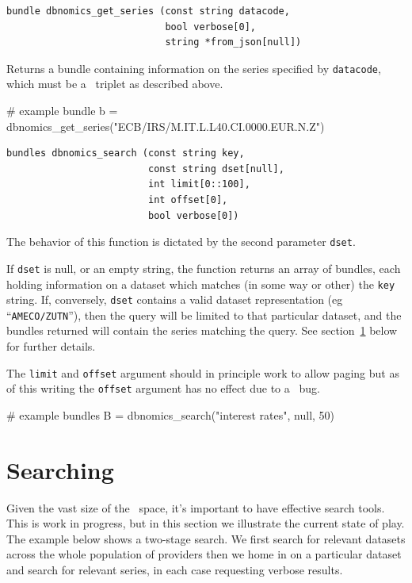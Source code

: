 \documentclass{article}
\begin{document}
\begin{funcdoc}
\begin{verbatim}
bundle dbnomics_get_series (const string datacode,
                            bool verbose[0],
                            string *from_json[null])
\end{verbatim}
Returns a bundle containing information on the series specified by
\texttt{datacode}, which must be a \DB\ triplet as
described above.
\begin{code}
# example
bundle b = dbnomics_get_series("ECB/IRS/M.IT.L.L40.CI.0000.EUR.N.Z")
\end{code}
\end{funcdoc}

\begin{funcdoc}
\begin{verbatim}
bundles dbnomics_search (const string key,
                         const string dset[null],
                         int limit[0::100],
                         int offset[0],
                         bool verbose[0])
\end{verbatim}
  The behavior of this function is dictated by the second parameter
  \texttt{dset}.

  If \texttt{dset} is null, or an empty string, the function
  returns an array of bundles, each holding information on a dataset
  which matches (in some way or other) the \texttt{key} string. If,
  conversely, \texttt{dset} contains a valid dataset representation
  (eg ``\texttt{AMECO/ZUTN}''), then the query will be limited to that
  particular dataset, and the bundles returned will contain the series
  matching the query. See section~\ref{sec:search} below for further
  details.

  The \texttt{limit} and \texttt{offset} argument should in principle
  work to allow paging but as of this writing the \texttt{offset}
  argument has no effect due to a \DB\ bug.
\begin{code}
# example
bundles B = dbnomics_search("interest rates", null, 50)
\end{code}
\end{funcdoc}

\section{Searching \DB}
\label{sec:search}

Given the vast size of the \DB\ space, it's important to
have effective search tools. This is work in progress, but in this
section we illustrate the current state of play. The example below
shows a two-stage search. We first search for relevant datasets across
the whole population of providers then we home in on a particular
dataset and search for relevant series, in each case requesting
verbose results.
\end{document}
